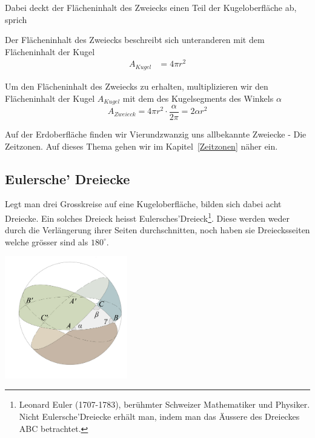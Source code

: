 \begin{refsection}
Dabei deckt der Flächeninhalt des Zweiecks einen Teil der Kugeloberfläche ab, sprich





Der Flächeninhalt des Zweiecks beschreibt sich unteranderen mit dem Flächeninhalt der Kugel
\begin{align*}
A_{ Kugel } &= 4 \pi r^{2}
\end{align*}

Um den Flächeninhalt des Zweiecks zu erhalten, multiplizieren wir den Flächeninhalt der Kugel $A_{ Kugel }$ mit dem des Kugelsegments des Winkels $\alpha$ 
\begin{equation}
A_{ Zweieck } = 4 \pi r^{2} \cdot \frac{ \alpha }{ 2 \pi } = 2 \alpha r^{2}
\end{equation}

Auf der Erdoberfläche finden wir Vierundzwanzig uns allbekannte Zweiecke - Die Zeitzonen. Auf dieses Thema gehen wir im Kapitel~\ref{Zeitzonen}  näher ein.


\subsection{Eulersche’ Dreiecke} \label{Euler} 
Legt man drei Grosskreise auf eine Kugeloberfläche, bilden sich dabei acht Dreiecke. 
Ein solches Dreieck heisst Eulersches’Dreieck\footnote{%
Leonard Euler (1707-1783), berühmter Schweizer Mathematiker und Physiker. 
Nicht Eulersche’Dreiecke erhält man, indem man das Äussere des Dreieckes ABC betrachtet.}.
Diese werden weder durch die Verlängerung ihrer Seiten durchschnitten, 
noch haben sie Dreiecksseiten welche grösser sind als $180^{\circ}$.

\begin{center}
        \includegraphics[width=0.4\textwidth]{kugel/_Eulersches.jpg}
\end{center}


\end{refsection}
